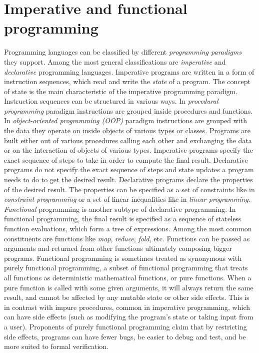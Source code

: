 \section{Imperative and functional programming}
\label{background_programming_paradigms}
\quad Programming languages can be classified by different \textit{programming paradigms} they support. Among the most general classifications are \textit{imperative} and \textit{declarative} programming languages.\newline\null
\quad Imperative programs are written in a form of instruction sequences, which read and write the \textit{state} of a program. The concept of state is the main characteristic of the imperative programming paradigm. Instruction sequences can be structured in various ways. In \textit{procedural programming} paradigm instructions are grouped inside procedures and functions. In \textit{object-oriented programming (OOP)} paradigm instructions are grouped with the data they operate on inside objects of various types or classes. Programs are built either out of various procedures calling each other and exchanging the data or on the interaction of objects of various types. Imperative programs specify the exact sequence of steps to take in order to compute the final result.\newline\null
\quad Declarative programs do not specify the exact sequence of steps and state updates a program needs to do to get the desired result. Declarative programs declare the properties of the desired result. The properties can be specified as a set of constraints like in \textit{constraint programming} or a set of linear inequalities like in \textit{linear programming}. \textit{Functional} programming is another subtype of declarative programming. In functional programming, the final result is specified as a sequence of stateless function evaluations, which form a tree of expressions. Among the most common constituents are functions like \textit{map}, \textit{reduce}, \textit{fold}, etc. Functions can be passed as arguments and returned from other functions ultimately composing bigger programs.\newline\null
\quad Functional programming is sometimes treated as synonymous with purely functional programming, a subset of functional programming that treats all functions as deterministic mathematical functions, or pure functions. When a pure function is called with some given arguments, it will always return the same result, and cannot be affected by any mutable state or other side effects. This is in contrast with impure procedures, common in imperative programming, which can have side effects (such as modifying the program's state or taking input from a user). Proponents of purely functional programming claim that by restricting side effects, programs can have fewer bugs, be easier to debug and test, and be more suited to formal verification.\newline\null
